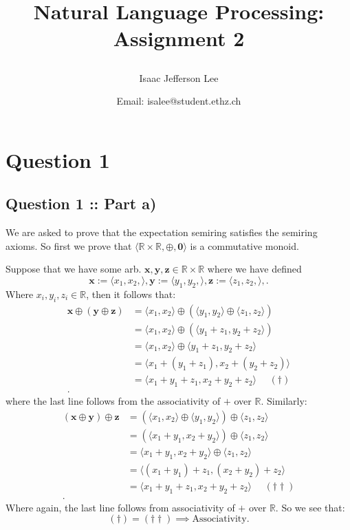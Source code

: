 \documentclass[a4paper]{article}
\title{Natural Language Processing: Assignment 2\author{Isaac Jefferson Lee}\date{Email: isalee@student.ethz.ch}}
\begin{document}
\maketitle
\thispagestyle{fancy} 

\section*{Question 1}

\subsection*{Question 1 :: Part a)}
We are asked to prove that the expectation semiring satisfies the semiring axioms.
So first we prove that $\langle \mathbb{R} \times \mathbb{R}, \oplus, \bm{0} \rangle$ is a
commutative monoid.

Suppose that we have some arb. $\bm{x}, \bm{y}, \bm{z} \in \mathbb{R}\times \mathbb{R}$ where we have defined
\[
\bm{x} := \langle x_1, x_2, \rangle,
\bm{y} := \langle y_1, y_2, \rangle,
\bm{z} := \langle z_1, z_2, \rangle,
.\]
Where $x_i, y_i, z_i \in \mathbb{R}$, then it follows that:
\begin{align*}
     \bm{x} \oplus (\bm{y} \oplus \bm{z}) &=   \langle x_1, x_2 \rangle \oplus (\langle y_1, y_2 \rangle \oplus \langle z_1, z_2 \rangle)\\ 
 &=  \langle x_1, x_2 \rangle \oplus (\langle y_1 + z_1, y_2 + z_2 \rangle)\\ 
 &=  \langle x_1, x_2 \rangle \oplus \langle y_1 + z_1, y_2 + z_2 \rangle\\ 
 &=  \langle x_1 + (y_1 + z_1), x_2 + (y_2 + z_2) \rangle\\ 
 &=  \langle x_1 + y_1 + z_1, x_2 + y_2 + z_2 \rangle ~ ~ ~ ~ ~ ~ (\dag)\\ 
.
\end{align*}
where the last line follows from the associativity of $+$ over  $\mathbb{R}$.
Similarly:
\begin{align*}
     (\bm{x} \oplus \bm{y}) \oplus \bm{z} &=  (\langle x_1, x_2 \rangle \oplus \langle y_1, y_2 \rangle) \oplus \langle z_1, z_2 \rangle\\ 
    &=  (\langle x_1 + y_1, x_2 + y_2 \rangle) \oplus \langle z_1, z_2 \rangle\\ 
    &=  \langle x_1 + y_1, x_2 + y_2 \rangle \oplus \langle z_1, z_2 \rangle\\ 
    &=  \langle (x_1 + y_1) + z_1, (x_2 + y_2) + z_2 \rangle\\ 
    &=  \langle x_1 + y_1 + z_1, x_2 + y_2+ z_2 \rangle ~ ~ ~ ~ ~ ~ (\dag\dag)\\ 
.
\end{align*}
Where again, the last line follows from associativity of $+$ over $\mathbb{R}$.
So we see that:
\[
    (\dag) = (\dag \dag) \implies \text{Associativity}
.\]
\end{document}
